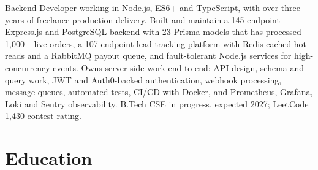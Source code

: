 \documentclass[11pt,a4paper,sans]{moderncv}
\begin{document}
\makecvtitle


\vspace{4pt}
\small{Backend Developer working in Node.js, ES6+ and TypeScript, with over three years of freelance production delivery. Built and maintain a 145-endpoint Express.js and PostgreSQL backend with 23 Prisma models that has processed 1,000+ live orders, a 107-endpoint lead-tracking platform with Redis-cached hot reads and a RabbitMQ payout queue, and fault-tolerant Node.js services for high-concurrency events. Owns server-side work end-to-end: API design, schema and query work, JWT and Auth0-backed authentication, webhook processing, message queues, automated tests, CI/CD with Docker, and Prometheus, Grafana, Loki and Sentry observability. B.Tech CSE in progress, expected 2027; LeetCode 1,430 contest rating.}


\section{Education}
\vspace{1pt}

\end{document}
